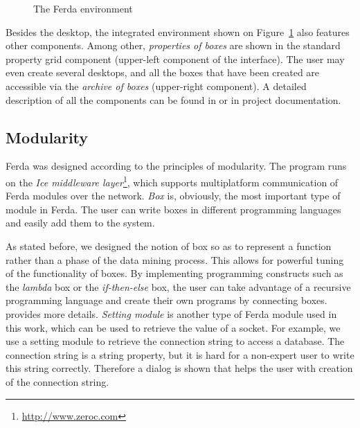 \begin{figure}[ht]
\centering
\mbox{}
\caption{The Ferda environment}
\label{fig:Ferda}
\end{figure}

Besides the desktop, the integrated environment shown on Figure~\ref{fig:Ferda} also features other components.
Among other, \emph{properties of boxes} are shown in the standard property grid component (upper-left component of the interface). 
The user may even create several desktops, and all the boxes that have been created are accessible via the \emph{archive of boxes} (upper-right component). 
A detailed description of all the components can be found in \cite{Ferda} or in project documentation.

\subsection{Modularity} \label{Modularity}
Ferda was designed according to the principles of modularity. 
The program runs on the \emph{Ice middleware layer}\footnote{\url{http://www.zeroc.com}}, which supports multiplatform communication of Ferda modules over the network. 
\emph{Box} is, obviously, the most important type of module in Ferda. 
The user can write boxes in different programming languages and easily add them to the system. 

As stated before, we designed the notion of box so as to represent a function rather than a phase of the data mining process. 
This allows for powerful tuning of the functionality of boxes. 
By implementing programming constructs such as the \emph{lambda} box or the \emph{if-then-else} box, the user can take advantage of a recursive programming language and create their own programs by connecting boxes. 
\cite{Kovac} provides more details. 
%
\emph{Setting module} is another type of Ferda module used in this work, which can be used to retrieve the value of a socket. 
For example, we use a setting module to retrieve the connection string to access a database. 
The connection string is a string property, but it is hard for a non-expert user to write this string correctly. 
Therefore a dialog is shown that helps the user with creation of the connection string.  

